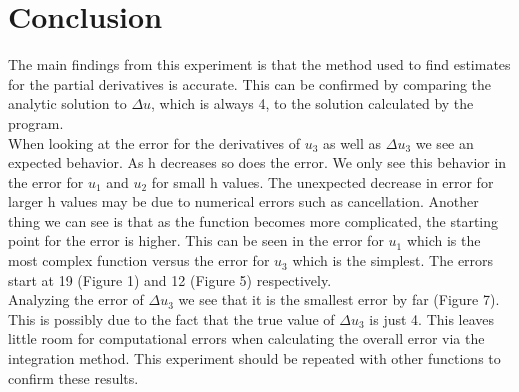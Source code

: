 \documentclass[12pt]{article}
\begin{document}
    	\section{Conclusion}
    	The main findings from this experiment is that the method used to find estimates for the partial derivatives is accurate. This can be confirmed by comparing the analytic solution to $\Delta u$, which is always 4, to the solution calculated by the program. \\ When looking at the error for the derivatives of $u_3$ as well as $\Delta u_3$ we see an expected behavior. As h decreases so does the error. We only see this behavior in the error for $u_1$ and $u_2$ for small h values. The unexpected decrease in error for larger h values may be due to numerical errors such as cancellation. Another thing we can see is that as the function becomes more complicated, the starting point for the error is higher. This can be seen in the error for $u_1$ which is the most complex function versus the error for $u_3$ which is the simplest. The errors start at 19 (Figure 1) and 12 (Figure 5) respectively. \\ Analyzing the error of $\Delta u_3$ we see that it is the smallest error by far (Figure 7). This is possibly due to the fact that the true value of $\Delta u_3$ is just 4. This leaves little room for computational errors when calculating the overall error via the integration method. This experiment should be repeated with other functions to confirm these results. 
\end{document}
